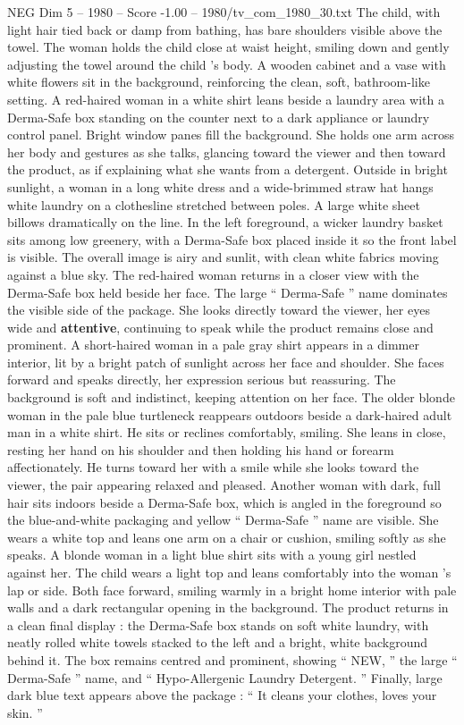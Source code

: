 \begin{textsample}{NEG Dim 5 – 1980 – Score -1.00 – 1980/tv\_com\_1980\_30.txt}
The child, with light hair tied back or damp from bathing, has bare shoulders visible above the towel.
The woman holds the child close at waist height, smiling down and gently adjusting the towel around the child ’s body.
A wooden cabinet and a vase with white flowers sit in the background, reinforcing the clean, soft, bathroom-like setting.
A red-haired woman in a white shirt leans beside a laundry area with a Derma-Safe box standing on the counter next to a dark appliance or laundry control panel.
Bright window panes fill the background.
She holds one arm across her body and gestures as she talks, glancing toward the viewer and then toward the product, as if explaining what she wants from a detergent.
Outside in bright sunlight, a woman in a long white dress and a wide-brimmed straw hat hangs white laundry on a clothesline stretched between poles.
A large white sheet billows dramatically on the line.
In the left foreground, a wicker laundry basket sits among low greenery, with a Derma-Safe box placed inside it so the front label is visible.
The overall image is airy and sunlit, with clean white fabrics moving against a blue sky.
The red-haired woman returns in a closer view with the Derma-Safe box held beside her face.
The large “ Derma-Safe ” name dominates the visible side of the package.
She looks directly toward the viewer, her eyes wide and \textbf{attentive}, continuing to speak while the product remains close and prominent.
A short-haired woman in a pale gray shirt appears in a dimmer interior, lit by a bright patch of sunlight across her face and shoulder.
She faces forward and speaks directly, her expression serious but reassuring.
The background is soft and indistinct, keeping attention on her face.
The older blonde woman in the pale blue turtleneck reappears outdoors beside a dark-haired adult man in a white shirt.
He sits or reclines comfortably, smiling.
She leans in close, resting her hand on his shoulder and then holding his hand or forearm affectionately.
He turns toward her with a smile while she looks toward the viewer, the pair appearing relaxed and pleased.
Another woman with dark, full hair sits indoors beside a Derma-Safe box, which is angled in the foreground so the blue-and-white packaging and yellow “ Derma-Safe ” name are visible.
She wears a white top and leans one arm on a chair or cushion, smiling softly as she speaks.
A blonde woman in a light blue shirt sits with a young girl nestled against her.
The child wears a light top and leans comfortably into the woman ’s lap or side.
Both face forward, smiling warmly in a bright home interior with pale walls and a dark rectangular opening in the background.
The product returns in a clean final display : the Derma-Safe box stands on soft white laundry, with neatly rolled white towels stacked to the left and a bright, white background behind it.
The box remains centred and prominent, showing “ NEW, ” the large “ Derma-Safe ” name, and “ Hypo-Allergenic Laundry Detergent. ” Finally, large dark blue text appears above the package : “ It cleans your clothes, loves your skin. ”

\end{textsample}
